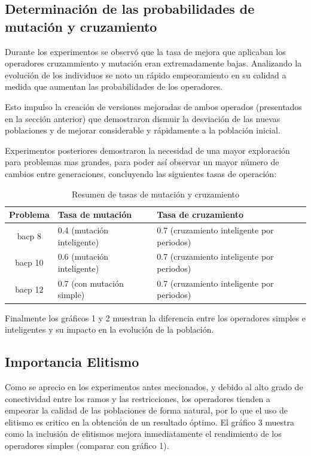 \documentclass[letter, 10pt]{article}
\begin{document}
\subsection{Determinación de las probabilidades de mutación y cruzamiento}
Durante los experimentos se observó que la tasa de mejora que aplicaban los
operadores cruzammiento y mutación eran extremadamente bajas. Analizando la
evolución de los individuos se noto un rápido empeoramiento en su calidad a
medida que aumentan las probabilidades de los operadores.

Esto impulso la creación de versiones mejoradas de ambos operados (presentados
en la sección anterior) que demostraron dismuir la desviación de las nuevas
poblaciones y de mejorar considerable y rápidamente a la población inicial.

Experimentos posteriores demostraron la necesidad de una mayor exploración para
problemas mas grandes, para poder así observar un mayor número de cambios entre
generaciones, concluyendo las siguientes tasas de operación:

\begin{table}[h]
\label{table:tasas}
\caption{Resumen de tasas de mutación y cruzamiento}
\begin{tabular}{|c|l|l|}
\hline 
Problema & Tasa de mutación  & Tasa de cruzamiento \tabularnewline
\hline 
\hline 
bacp 8 & 0.4 (mutación inteligente) & 0.7 (cruzamiento inteligente por periodos) \tabularnewline
\hline 
bacp 10 & 0.6 (mutación inteligente) & 0.7 (cruzamiento inteligente por periodos) \tabularnewline
\hline 
bacp 12 & 0.7 (con mutación simple) & 0.7 (cruzamiento inteligente por periodos) \tabularnewline
\hline 
\end{tabular}
\end{table}

Finalmente los gráficos 1 y 2 muestran la diferencia entre los operadores
simples e inteligentes y su impacto en la evolución de la población.

\begin{center}

\end{center}



\begin{center}

\end{center}



\subsection{Importancia Elitismo}
Como se aprecio en los experimentos antes mecionados, y debido al alto grado de
conectividad entre los ramos y las restricciones, los operadores tienden a
empeorar la calidad de las poblaciones de forma natural, por lo que el uso de
elitismo es critico en la obtención de un resultado óptimo. El gráfico 3 muestra
como la inclusión de elitismos mejora inmediatamente el rendimiento de los
operadores simples (comparar con gráfico 1).
\end{document}
